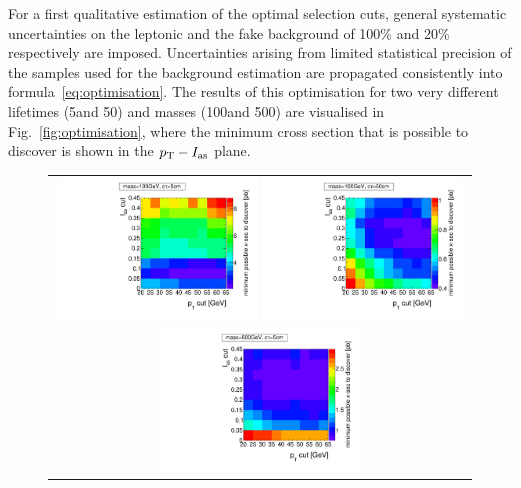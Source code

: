 For a first qualitative estimation of the optimal selection cuts, general systematic uncertainties on the leptonic and the fake background of 100\% and 20\% respectively are imposed.
Uncertainties arising from limited statistical precision of the samples used for the background estimation are propagated consistently into formula~\ref{eq:optimisation}.
The results of this optimisation for two very different lifetimes (5\cm and 50\cm) and masses (100\gev and 500\gev) are visualised in Fig.~\ref{fig:optimisation}, where the minimum cross section that is possible to discover is shown in the $p_{\text{T}}-I_{\text{as}}$ plane.
\begin{figure}[!h]
  \centering 
  \vspace{50pt}
  \begin{tabular}{c}
    \includegraphics[width=0.49\textwidth]{figures/analysis/Optimisation/Madgraph_signal_mass_100_ctau_5cm_ECaloLe5_SOverDeltaBStatPlusSys.pdf} 
    \includegraphics[width=0.49\textwidth]{figures/analysis/Optimisation/Madgraph_signal_mass_100_ctau_50cm_ECaloLe5_SOverDeltaBStatPlusSys.pdf}\\ 
    \includegraphics[width=0.49\textwidth]{figures/analysis/Optimisation/Madgraph_signal_mass_500_ctau_5cm_ECaloLe5_SOverDeltaBStatPlusSys.pdf}

\end{tabular}
\end{figure}

